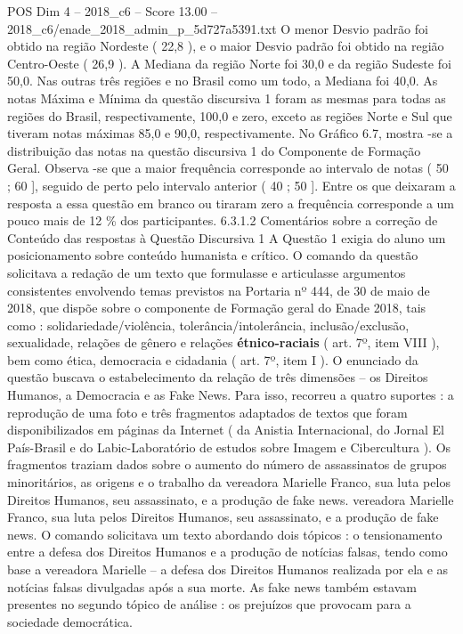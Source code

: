 \begin{textsample}{POS Dim 4 – 2018\_c6 – Score 13.00 – 2018\_c6/enade\_2018\_admin\_p\_5d727a5391.txt}
O menor Desvio padrão foi obtido na região Nordeste ( 22,8 ), e o maior Desvio padrão foi obtido na região Centro-Oeste ( 26,9 ).
A Mediana da região Norte foi 30,0 e da região Sudeste foi 50,0.
Nas outras três regiões e no Brasil como um todo, a Mediana foi 40,0.
As notas Máxima e Mínima da questão discursiva 1 foram as mesmas para todas as regiões do Brasil, respectivamente, 100,0 e zero, exceto as regiões Norte e Sul que tiveram notas máximas 85,0 e 90,0, respectivamente.
No Gráfico 6.7, mostra -se a distribuição das notas na questão discursiva 1 do Componente de Formação Geral.
Observa -se que a maior frequência corresponde ao intervalo de notas ( 50 ; 60 ], seguido de perto pelo intervalo anterior ( 40 ; 50 ].
Entre os que deixaram a resposta a essa questão em branco ou tiraram zero a frequência corresponde a um pouco mais de 12 \% dos participantes. 6.3.1.2 Comentários sobre a correção de Conteúdo das respostas à Questão Discursiva 1 A Questão 1 exigia do aluno um posicionamento sobre conteúdo humanista e crítico.
O comando da questão solicitava a redação de um texto que formulasse e articulasse argumentos consistentes envolvendo temas previstos na Portaria nº 444, de 30 de maio de 2018, que dispõe sobre o componente de Formação geral do Enade 2018, tais como : solidariedade/violência, tolerância/intolerância, inclusão/exclusão, sexualidade, relações de gênero e relações \textbf{étnico-raciais} ( art. 7º, item VIII ), bem como ética, democracia e cidadania ( art. 7º, item I ).
O enunciado da questão buscava o estabelecimento da relação de três dimensões – os Direitos Humanos, a Democracia e as Fake News.
Para isso, recorreu a quatro suportes : a reprodução de uma foto e três fragmentos adaptados de textos que foram disponibilizados em páginas da Internet ( da Anistia Internacional, do Jornal El País-Brasil e do Labic-Laboratório de estudos sobre Imagem e Cibercultura ).
Os fragmentos traziam dados sobre o aumento do número de assassinatos de grupos minoritários, as origens e o trabalho da vereadora Marielle Franco, sua luta pelos Direitos Humanos, seu assassinato, e a produção de fake news. vereadora Marielle Franco, sua luta pelos Direitos Humanos, seu assassinato, e a produção de fake news.
O comando solicitava um texto abordando dois tópicos : o tensionamento entre a defesa dos Direitos Humanos e a produção de notícias falsas, tendo como base a vereadora Marielle – a defesa dos Direitos Humanos realizada por ela e as notícias falsas divulgadas após a sua morte.
As fake news também estavam presentes no segundo tópico de análise : os prejuízos que provocam para a sociedade democrática.

\end{textsample}
